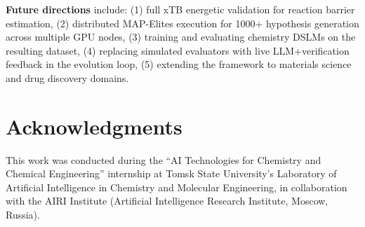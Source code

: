 \documentclass{article}
\begin{document}
\textbf{Future directions} include: (1) full xTB energetic validation for reaction barrier estimation, (2) distributed MAP-Elites execution for 1000+ hypothesis generation across multiple GPU nodes, (3) training and evaluating chemistry DSLMs on the resulting dataset, (4) replacing simulated evaluators with live LLM+verification feedback in the evolution loop, (5) extending the framework to materials science and drug discovery domains.

\section*{Acknowledgments}
This work was conducted during the ``AI Technologies for Chemistry and Chemical Engineering'' internship at Tomsk State University's Laboratory of Artificial Intelligence in Chemistry and Molecular Engineering, in collaboration with the AIRI Institute (Artificial Intelligence Research Institute, Moscow, Russia).



\end{document}
